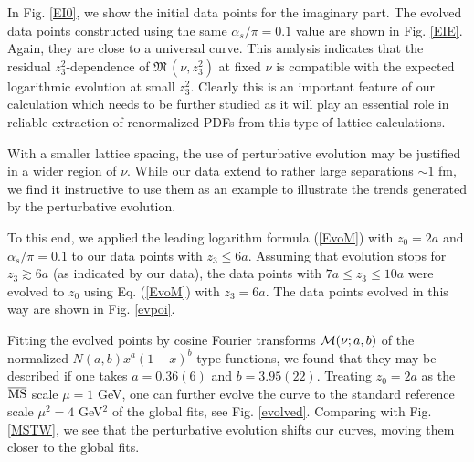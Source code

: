  In  Fig. \ref{EI0},    we show the initial data points for the imaginary  part. The evolved data points
 constructed using the same  $\alpha_s/\pi =0.1$ value  are shown  in Fig. \ref{EIE}.
        Again, they are close to a universal curve.
        This analysis indicates that the residual $z_3^2$-dependence
         of ${\mathfrak M}\,  (\nu, z_3^2)$ at fixed $\nu$ is compatible with the expected logarithmic evolution at small $z_3^2$.
Clearly this is an important feature of our calculation which needs to be further studied as it will play an essential role in reliable extraction of renormalized PDFs from this type of lattice calculations.


With a smaller lattice spacing, the use of perturbative evolution may be justified  %
in a wider region of $\nu$. While our data extend to rather large %
separations $\sim 1$ fm, we find it instructive  to use them as an example to   %
 illustrate the trends generated  by %
the perturbative evolution.    %

To this end, we applied the leading logarithm formula %
(\ref{EvoM}) with $z_0=2a$ and $\alpha_s/\pi=0.1$ to our data points with $z_3 \leq 6a$.  %
Assuming that evolution stops for $z_3 \gtrsim 6a$ (as indicated by our data), %
the data points with \mbox{$7a \leq z_3 \leq 10a$}   %
 were evolved to $z_0$ using Eq. (\ref{EvoM}) with $z_3=6a$. %
The  data points evolved in this way are shown in Fig. \ref{evpoi}.    %


Fitting  the evolved  points by  cosine Fourier transforms ${\cal M} (\nu;a,b)$ of the %
normalized $N(a,b) x^a(1-x)^b$-type  functions,  %
we  found that they may be described if one takes $a = 0.36(6)$  and $b=3.95(22)$.  %
Treating $z_0=2a$ as the $\overline{\rm MS}$ scale $\mu=1$ GeV, one can further evolve  %
the curve to the standard reference scale $\mu^2 = 4$ GeV$^2$ of the global fits, see Fig. \ref{evolved}.    %
Comparing with Fig. \ref{MSTW}, we see that the perturbative evolution shifts   %
our curves,  moving them  closer to the global fits.   %
